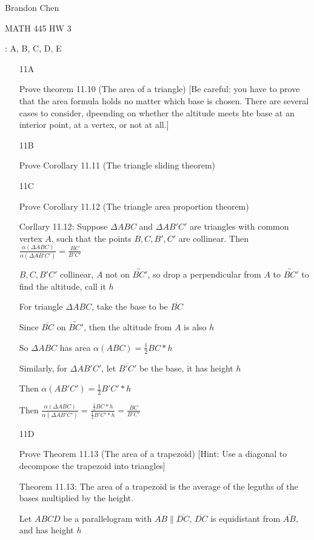 \documentclass[11pt]{article}
\newcommand{\lines}[1]{\overleftrightarrow{#1}}
\newcommand{\segment}[1]{\overline{#1}}
\begin{document}
\noindent Brandon Chen

\noindent MATH 445 HW 3

: A, B, C, D, E

\begin{itemize}

	\item[11A]
		
		Prove theorem 11.10 (The area of a triangle) [Be careful: you have to prove that the area formula holds no matter which base is chosen. There are several cases to consider, dpeending on whether the altitude meets hte base at an interior point, at a vertex, or not at all.]

	\item[11B]

		Prove Corollary 11.11 (The triangle sliding theorem)

	\item[11C]

		Prove Corollary 11.12 (The triangle area proportion theorem)

		Corllary 11.12: Suppose $\Delta ABC$ and $\Delta AB'C'$ are triangles with common vertex $A$, such that the points $B,C,B',C'$ are collinear. Then $\frac{\alpha(\Delta ABC)}{\alpha(\Delta AB'C')} = \frac{BC}{B'C'}$

		$B,C,B'C'$ collinear, $A$ not on $\lines{BC'}$, so drop a perpendicular from $A$ to $\lines{BC'}$ to find the altitude, call it $h$

		For triangle $\Delta ABC$, take the base to be $\segment{BC}$

		Since $\segment{BC}$ on $\lines{BC'}$, then the altitude from $A$ is also $h$

		So $\Delta ABC$ has area $\alpha(ABC) = \frac{1}{2} BC*h$

		Similarly, for $\Delta AB'C'$, let $\segment{B'C'}$ be the base, it has height $h$

		Then $\alpha(AB'C') = \frac{1}{2} B'C'*h$

		Then $\frac{\alpha(\Delta ABC)}{\alpha(\Delta AB'C')} = \frac{\frac{1}{2}BC*h}{\frac{1}{2}B'C'*h} =	\frac{BC}{B'C'}$
	\item[11D]

		Prove Theorem 11.13 (The area of a trapezoid) [Hint: Use a diagonal to decompose the trapezoid into triangles]

		Theorem 11.13: The area of a trapezoid is the average of the legnths of the bases multiplied by the height.

		Let $ABCD$ be a parallelogram with $\segment{AB} \parallel \segment{DC}$, $\segment{DC}$ is equidistant from $\segment{AB}$, and has height $h$


\end{itemize}
\end{document}
